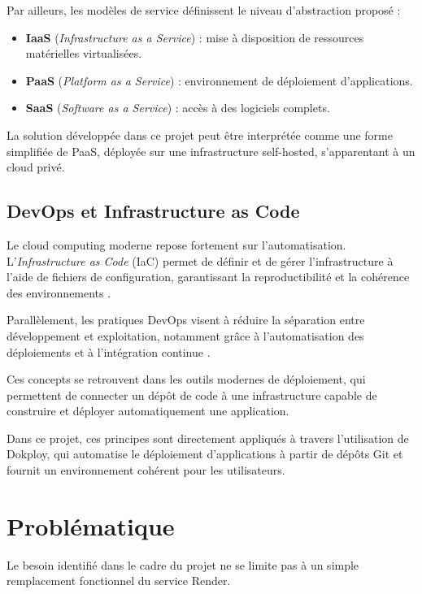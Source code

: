 \documentclass{rapportClass} %
\begin{document}
Par ailleurs, les modèles de service définissent le niveau
d'abstraction proposé \cite{NIST2026, ISO2026} :

\begin{itemize}
\item \textbf{IaaS} (\textit{Infrastructure as a Service}) : mise à disposition
de ressources matérielles virtualisées.
\item \textbf{PaaS} (\textit{Platform as a Service}) : environnement de
déploiement d'applications.
\item \textbf{SaaS} (\textit{Software as a Service}) : accès à des logiciels
complets.
\end{itemize}

La solution développée dans ce projet peut être interprétée comme une
forme simplifiée de PaaS, déployée sur une infrastructure
self-hosted, s'apparentant à un cloud privé.

\subsection{DevOps et Infrastructure as Code}

Le cloud computing moderne repose fortement sur l'automatisation.
L'\textit{Infrastructure as Code} (IaC) permet de définir et de gérer
l'infrastructure à l'aide de fichiers de configuration, garantissant
la reproductibilité et la cohérence des environnements \cite{Morris2016}.

Parallèlement, les pratiques DevOps visent à réduire la séparation
entre développement et exploitation, notamment grâce à
l'automatisation des déploiements et à l'intégration continue
\cite{Bass2015}.

Ces concepts se retrouvent dans les outils modernes de déploiement,
qui permettent de connecter un dépôt de code à une infrastructure
capable de construire et déployer automatiquement une application.

Dans ce projet, ces principes sont directement appliqués à travers
l'utilisation de Dokploy, qui automatise le déploiement d'applications
à partir de dépôts Git et fournit un environnement cohérent pour les
utilisateurs.

\section{Problématique}

Le besoin identifié dans le cadre du projet ne se limite pas à un
simple remplacement fonctionnel du service Render. 
\end{document}
